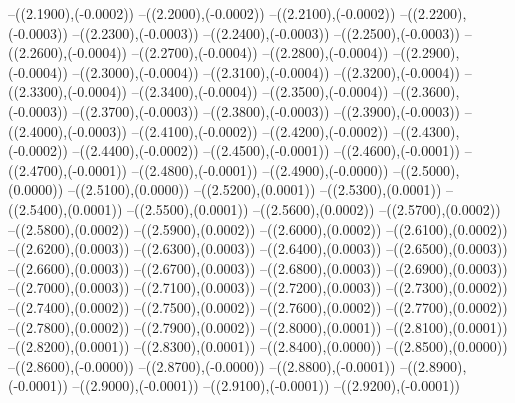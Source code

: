 {	--({\sx*(2.1900)},{\sy*(-0.0002)})
	--({\sx*(2.2000)},{\sy*(-0.0002)})
	--({\sx*(2.2100)},{\sy*(-0.0002)})
	--({\sx*(2.2200)},{\sy*(-0.0003)})
	--({\sx*(2.2300)},{\sy*(-0.0003)})
	--({\sx*(2.2400)},{\sy*(-0.0003)})
	--({\sx*(2.2500)},{\sy*(-0.0003)})
	--({\sx*(2.2600)},{\sy*(-0.0004)})
	--({\sx*(2.2700)},{\sy*(-0.0004)})
	--({\sx*(2.2800)},{\sy*(-0.0004)})
	--({\sx*(2.2900)},{\sy*(-0.0004)})
	--({\sx*(2.3000)},{\sy*(-0.0004)})
	--({\sx*(2.3100)},{\sy*(-0.0004)})
	--({\sx*(2.3200)},{\sy*(-0.0004)})
	--({\sx*(2.3300)},{\sy*(-0.0004)})
	--({\sx*(2.3400)},{\sy*(-0.0004)})
	--({\sx*(2.3500)},{\sy*(-0.0004)})
	--({\sx*(2.3600)},{\sy*(-0.0003)})
	--({\sx*(2.3700)},{\sy*(-0.0003)})
	--({\sx*(2.3800)},{\sy*(-0.0003)})
	--({\sx*(2.3900)},{\sy*(-0.0003)})
	--({\sx*(2.4000)},{\sy*(-0.0003)})
	--({\sx*(2.4100)},{\sy*(-0.0002)})
	--({\sx*(2.4200)},{\sy*(-0.0002)})
	--({\sx*(2.4300)},{\sy*(-0.0002)})
	--({\sx*(2.4400)},{\sy*(-0.0002)})
	--({\sx*(2.4500)},{\sy*(-0.0001)})
	--({\sx*(2.4600)},{\sy*(-0.0001)})
	--({\sx*(2.4700)},{\sy*(-0.0001)})
	--({\sx*(2.4800)},{\sy*(-0.0001)})
	--({\sx*(2.4900)},{\sy*(-0.0000)})
	--({\sx*(2.5000)},{\sy*(0.0000)})
	--({\sx*(2.5100)},{\sy*(0.0000)})
	--({\sx*(2.5200)},{\sy*(0.0001)})
	--({\sx*(2.5300)},{\sy*(0.0001)})
	--({\sx*(2.5400)},{\sy*(0.0001)})
	--({\sx*(2.5500)},{\sy*(0.0001)})
	--({\sx*(2.5600)},{\sy*(0.0002)})
	--({\sx*(2.5700)},{\sy*(0.0002)})
	--({\sx*(2.5800)},{\sy*(0.0002)})
	--({\sx*(2.5900)},{\sy*(0.0002)})
	--({\sx*(2.6000)},{\sy*(0.0002)})
	--({\sx*(2.6100)},{\sy*(0.0002)})
	--({\sx*(2.6200)},{\sy*(0.0003)})
	--({\sx*(2.6300)},{\sy*(0.0003)})
	--({\sx*(2.6400)},{\sy*(0.0003)})
	--({\sx*(2.6500)},{\sy*(0.0003)})
	--({\sx*(2.6600)},{\sy*(0.0003)})
	--({\sx*(2.6700)},{\sy*(0.0003)})
	--({\sx*(2.6800)},{\sy*(0.0003)})
	--({\sx*(2.6900)},{\sy*(0.0003)})
	--({\sx*(2.7000)},{\sy*(0.0003)})
	--({\sx*(2.7100)},{\sy*(0.0003)})
	--({\sx*(2.7200)},{\sy*(0.0003)})
	--({\sx*(2.7300)},{\sy*(0.0002)})
	--({\sx*(2.7400)},{\sy*(0.0002)})
	--({\sx*(2.7500)},{\sy*(0.0002)})
	--({\sx*(2.7600)},{\sy*(0.0002)})
	--({\sx*(2.7700)},{\sy*(0.0002)})
	--({\sx*(2.7800)},{\sy*(0.0002)})
	--({\sx*(2.7900)},{\sy*(0.0002)})
	--({\sx*(2.8000)},{\sy*(0.0001)})
	--({\sx*(2.8100)},{\sy*(0.0001)})
	--({\sx*(2.8200)},{\sy*(0.0001)})
	--({\sx*(2.8300)},{\sy*(0.0001)})
	--({\sx*(2.8400)},{\sy*(0.0000)})
	--({\sx*(2.8500)},{\sy*(0.0000)})
	--({\sx*(2.8600)},{\sy*(-0.0000)})
	--({\sx*(2.8700)},{\sy*(-0.0000)})
	--({\sx*(2.8800)},{\sy*(-0.0001)})
	--({\sx*(2.8900)},{\sy*(-0.0001)})
	--({\sx*(2.9000)},{\sy*(-0.0001)})
	--({\sx*(2.9100)},{\sy*(-0.0001)})
	--({\sx*(2.9200)},{\sy*(-0.0001)})
}

